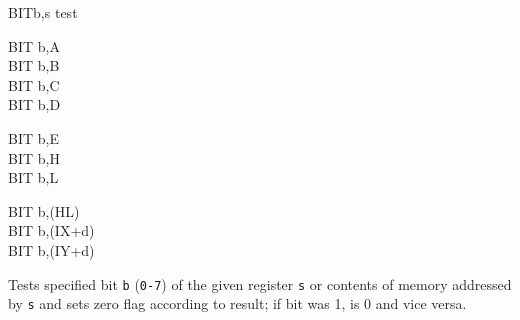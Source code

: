 \begin{basedescript}{
	\desclabelstyle{\multilinelabel}
	\desclabelwidth{3cm}}

	\begin{DetailItem}{BIT}{b,s}
		{test }
		{}

		\begin{DetailVariants}
			BIT b,A\\
			BIT b,B\\
			BIT b,C\\
			BIT b,D

			\columnbreak
			BIT b,E\\
			BIT b,H\\
			BIT b,L
			
			\columnbreak
			BIT b,(HL)\\
			BIT b,(IX+d)\\
			BIT b,(IY+d)
		\end{DetailVariants}

		Tests specified bit {\tt b} ({\tt 0-7}) of the given register {\tt s} or contents of memory addressed by {\tt s} and sets zero flag according to result; if bit was 1, \FlagZF{} is 0 and vice versa.

		\begin{DetailEffects}
			\FlagsBITr
		\end{DetailEffects}

		\begin{DetailEffectsFlags}
		\end{DetailEffectsFlags}

		\begin{DetailTiming}
		\end{DetailTiming}

	\end{DetailItem}



\end{basedescript}
